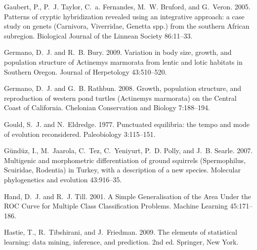 \documentclass[12pt,letterpaper]{article}
\begin{document}
\begin{thebibliography}{77}
        Gaubert, P., P.~J. Taylor, C.~a. Fernandes, M.~W. Bruford, and G.~Veron. 2005.
        {Patterns of cryptic hybridization revealed using an integrative approach: a
          case study on genets (Carnivora, Viverridae, Genetta spp.) from the southern
        African subregion}. Biological Journal of the Linnean Society 86:11--33.

        Germano, D.~J. and R.~B. Bury. 2009. {Variation in body size, growth, and
          population structure of Actinemys marmorata from lentic and lotic habitats in
        Southern Oregon}. Journal of Herpetology 43:510--520.

        Germano, D.~J. and G.~B. Rathbun. 2008. {Growth, population structure, and
          reproduction of western pond turtles (Actinemys marmorata) on the Central
        Coast of California}. Chelonian Conservation and Biology 7:188--194.

        Gould, S.~J. and N.~Eldredge. 1977. {Punctuated equilibria: the tempo and mode
        of evolution reconsidered}. Paleobiology 3:115--151.

        G\"{u}nd\"{u}z, I., M.~Jaarola, C.~Tez, C.~Yeniyurt, P.~D. Polly, and J.~B.
        Searle. 2007. {Multigenic and morphometric differentiation of ground
          squirrels (Spermophilus, Scuiridae, Rodentia) in Turkey, with a description
        of a new species.} Molecular phylogenetics and evolution 43:916--35.

        Hand, D.~J. and R.~J. Till. 2001. {A Simple Generalisation of the Area Under
        the ROC Curve for Multiple Class Classification Problems}. Machine Learning
        45:171--186.

        Hastie, T., R.~Tibshirani, and J.~Friedman. 2009. {The elements of statistical
        learning: data mining, inference, and prediction}. 2nd ed. Springer, New
        York.


\end{thebibliography}
\end{document}
